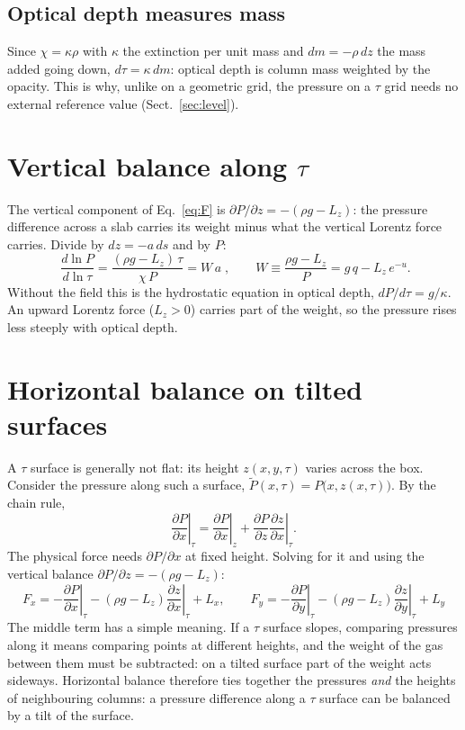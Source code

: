 \subsection{Optical depth measures mass}
Since $\chi=\kappa\rho$ with $\kappa$ the extinction per unit mass and $dm=-\rho\,dz$ the mass added going down,
$d\tau=\kappa\,dm$: optical depth is column mass weighted by the opacity. This is why, unlike on a geometric grid, the
pressure on a $\tau$ grid needs no external reference value (Sect.~\ref{sec:level}).



\section{\texorpdfstring{Vertical balance along $\tau$}{Vertical balance along tau}}\label{sec:vert}
The vertical component of Eq.~\eqref{eq:F} is $\partial P/\partial z=-(\rho g-L_z)$: the pressure difference across a slab
carries its weight minus what the vertical Lorentz force carries. Divide by $dz=-a\,ds$ and by $P$:
\begin{equation}
\boxed{\;\frac{d\ln P}{d\ln\tau}=\frac{(\rho g-L_z)\,\tau}{\chi\,P}=W\,a\;},\qquad W\equiv\frac{\rho g-L_z}{P}=g\,q-L_z\,e^{-u}.
\label{eq:vert}
\end{equation}
Without the field this is the hydrostatic equation in optical depth, $dP/d\tau=g/\kappa$. An upward Lorentz force
($L_z>0$) carries part of the weight, so the pressure rises less steeply with optical depth.

\section{Horizontal balance on tilted surfaces}\label{sec:horiz}
A $\tau$ surface is generally not flat: its height $z(x,y,\tau)$ varies across the box. Consider the pressure along such a
surface, $\tilde P(x,\tau)=P\big(x,z(x,\tau)\big)$. By the chain rule,
\begin{equation}
\left.\frac{\partial P}{\partial x}\right|_\tau=\left.\frac{\partial P}{\partial x}\right|_z+\frac{\partial P}{\partial z}\left.\frac{\partial z}{\partial x}\right|_\tau .
\end{equation}
The physical force needs $\partial P/\partial x$ at fixed height. Solving for it and using the vertical balance
$\partial P/\partial z=-(\rho g-L_z)$:
\begin{equation}
\boxed{\;F_x=-\left.\frac{\partial P}{\partial x}\right|_\tau-(\rho g-L_z)\left.\frac{\partial z}{\partial x}\right|_\tau+L_x,\qquad
F_y=-\left.\frac{\partial P}{\partial y}\right|_\tau-(\rho g-L_z)\left.\frac{\partial z}{\partial y}\right|_\tau+L_y\;}\label{eq:horiz}
\end{equation}
The middle term has a simple meaning. If a $\tau$ surface slopes, comparing pressures along it means comparing points at
different heights, and the weight of the gas between them must be subtracted: on a tilted surface part of the weight acts
sideways. Horizontal balance therefore ties together the pressures \emph{and} the heights of neighbouring columns: a pressure
difference along a $\tau$ surface can be balanced by a tilt of the surface.


